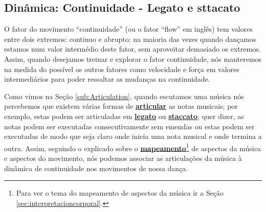 \subsection{Dinâmica: Continuidade - Legato e sttacato}
\label{subsec:continuidade:ls}


O fator do movimento ``continuidade'' (ou o fator ``flow'' em inglês) 
tem valores entre dois extremos: continuo e  abrupto;
na maioria das vezes quando dançamos estamos num valor intermédio deste fator,
sem aproveitar demasiado os extremos.
Assim, quando desejamos treinar e explorar o fator continuidade, nós manteremos na medida do possível
os outros fatores como velocidade e força em valores intermediários
para poder ressaltar as mudanças na continuidade.

Como vimos na Seção \ref{sub:Articulation}, 
quando escutamos uma música nós percebemos que existem várias formas de \hyperref[sub:Articulation]{\textbf{articular}} as notas musicais;
por exemplo, estas podem ser articuladas em 
\hyperref[subsec:Legato]{\textbf{legato}} ou \hyperref[subsec:Staccato]{\textbf{staccato}};
quer dizer, as notas podem ser executadas consecutivamente sem emendas ou 
estas podem ser executadas de modo que seja claro onde inicia uma nota musical e onde termina a outra.
Assim, 
seguindo o explicado sobre o \hyperref[sec:interpretacioncorporal]{\textbf{mapeamento}}\footnote{Para
ver o tema do mapeamento de aspectos da música ir a Seção \ref{sec:interpretacioncorporal}.} 
de aspectos da música e aspectos do movimento,
nós podemos associar as articulações da música à dinâmica de continuidade nos movimentos de nossa dança.\\


